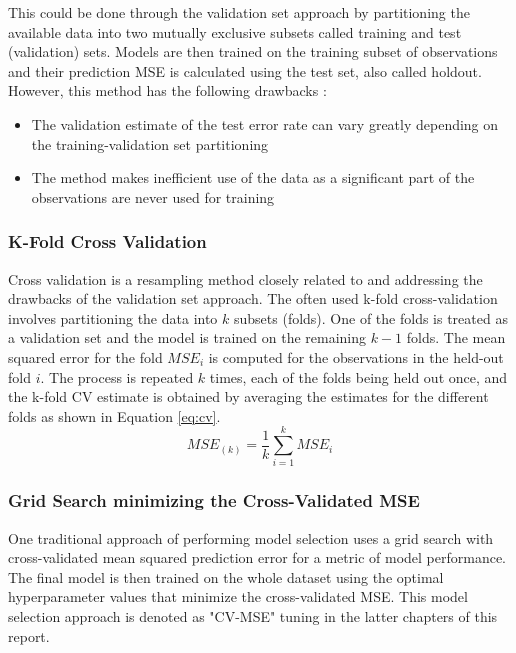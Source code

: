 This could be done through the validation set approach by partitioning the available data into two mutually exclusive subsets called training and test (validation) sets. Models are then trained on the training subset of observations and their prediction MSE is calculated using the test set, also called holdout. However, this method has the following drawbacks \cite{james2013introduction}:
\begin{itemize}
	\item The validation estimate of the test error rate can vary greatly depending on the training-validation set partitioning
	\item The method makes inefficient use of the data as a significant part of the observations are never used for training
\end{itemize} 

\subsubsection{K-Fold Cross Validation}
Cross validation \cite{james2013introduction, kohavi1995study} is a resampling method closely related to and addressing the drawbacks of the validation set approach. The often used k-fold cross-validation involves partitioning the data into $k$ subsets (folds). One of the folds is treated as a validation set and the model is trained on the remaining $k-1$ folds. The mean squared error for the fold $MSE_i$ is computed for the observations in the held-out fold $i$. The process is repeated $k$ times, each of the folds being held out once, and the k-fold CV estimate is obtained by averaging the estimates for the different folds as shown in Equation \ref{eq:cv}.
\begin{equation} \label{eq:cv}
MSE_{(k)} = \frac{1}{k} \sum_{i=1}^{k} MSE_i
\end{equation}

\subsubsection{Grid Search minimizing the Cross-Validated MSE}
One traditional approach of performing model selection uses a grid search with cross-validated mean squared prediction error for a metric of model performance. The final model is then trained on the whole dataset using the optimal hyperparameter values that minimize the cross-validated MSE. This model selection approach is denoted as "CV-MSE" tuning in the latter chapters of this report.

